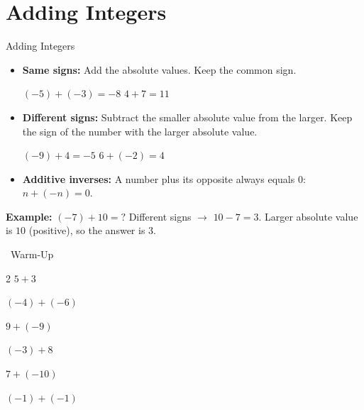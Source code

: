 \section{Adding Integers}

\begin{quickReview}{Adding Integers}
\begin{itemize}[leftmargin=*]
    \item \textbf{Same signs:} Add the absolute values. Keep the common sign.
    
    $(-5) + (-3) = -8$ \qquad $4 + 7 = 11$
    \item \textbf{Different signs:} Subtract the smaller absolute value from the larger. Keep the sign of the number with the larger absolute value.
    
    $(-9) + 4 = -5$ \qquad $6 + (-2) = 4$
    \item \textbf{Additive inverses:} A number plus its opposite always equals $0$: \quad $n + (-n) = 0$.
\end{itemize}

\medskip
\textbf{Example:} $(-7) + 10 = ?$ \quad Different signs $\to$ $10 - 7 = 3$. Larger absolute value is $10$ (positive), so the answer is $3$.
\end{quickReview}

\begin{practiceBox}[funGreen]{\faSun~Warm-Up}


\begin{multicols}{2}
\prob $5 + 3$ \answerBlank[2cm]

\prob $(-4) + (-6)$ \answerBlank[2cm]

\prob $9 + (-9)$ \answerBlank[2cm]

\prob $(-3) + 8$ \answerBlank[2cm]

\prob $7 + (-10)$ \answerBlank[2cm]

\prob $(-1) + (-1)$ \answerBlank[2cm]
\end{multicols}
\end{practiceBox}

